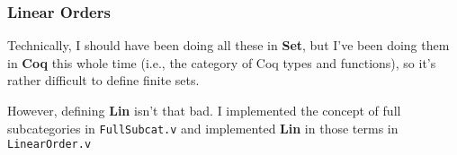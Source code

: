 \documentclass[12pt,twocolumn,oneside]{book}
\begin{document}
\subsubsection{Linear Orders}

Technically, I should have been doing all these in \textbf{Set}, but I've been
doing them in \textbf{Coq} this whole time (i.e., the category of Coq
types and functions), so it's rather difficult to define finite sets.

However, defining \textbf{Lin} isn't that bad. I implemented the concept of full
subcategories in \texttt{FullSubcat.v} and implemented \textbf{Lin} in those terms
in \texttt{LinearOrder.v}
\end{document}
